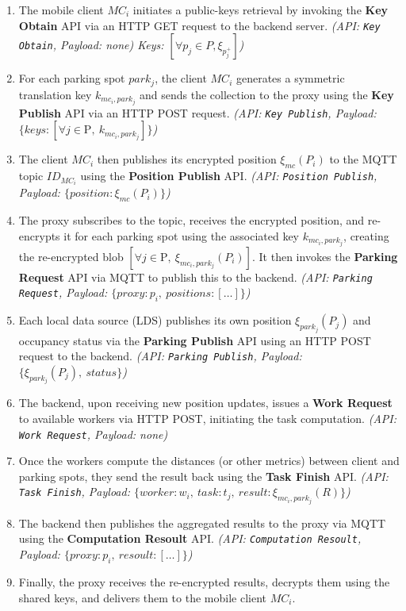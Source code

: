 \documentclass[12pt,a4paper,twoside]{book}
\begin{document}
\begin{enumerate}
    \item The mobile client $MC_i$ initiates a public-keys retrieval by invoking the \textbf{Key Obtain} API via an HTTP GET request to the backend server. \emph{(API: \texttt{Key Obtain}, Payload: none) \to Keys: $[\forall p_j \in P, \xi_{p_j^+}]$)}
    \item For each parking spot $park_j$, the client $MC_i$ generates a symmetric translation key $k_{mc_i, park_j}$ and sends the collection to the proxy using the \textbf{Key Publish} API via an HTTP POST request. \emph{(API: \texttt{Key Publish}, Payload: $\{keys: [\forall j \in \text{P},\ k_{mc_i, park_j}]\}$)}
    \item The client $MC_i$ then publishes its encrypted position $\xi_{mc}(P_i)$ to the MQTT topic $ID_{MC_i}$ using the \textbf{Position Publish} API. \emph{(API: \texttt{Position Publish}, Payload: $\{position: \xi_{mc}(P_i)\}$)}
    \item The proxy subscribes to the topic, receives the encrypted position, and re-encrypts it for each parking spot using the associated key $k_{mc_i, park_j}$, creating the re-encrypted blob $[\forall j \in \text{P},\ \xi_{mc_i, park_j}(P_i)]$. It then invokes the \textbf{Parking Request} API via MQTT to publish this to the backend. \emph{(API: \texttt{Parking Request}, Payload: $\{proxy: p_i,\ positions: [\ldots]\}$)}
    \item Each local data source (LDS) publishes its own position $\xi_{park_j}(P_j)$ and occupancy status via the \textbf{Parking Publish} API using an HTTP POST request to the backend. \emph{(API: \texttt{Parking Publish}, Payload: $\{\xi_{park_j}(P_j),\ status\}$)}
    \item The backend, upon receiving new position updates, issues a \textbf{Work Request} to available workers via HTTP POST, initiating the task computation. \emph{(API: \texttt{Work Request}, Payload: none)}
    \item Once the workers compute the distances (or other metrics) between client and parking spots, they send the result back using the \textbf{Task Finish} API. \emph{(API: \texttt{Task Finish}, Payload: $\{worker: w_i,\ task: t_j,\ result: \xi_{mc_i, park_j}(R)\}$)}
    \item The backend then publishes the aggregated results to the proxy via MQTT using the \textbf{Computation Resoult} API. \emph{(API: \texttt{Computation Resoult}, Payload: $\{proxy: p_i,\ resoult: [\ldots]\}$)}
    \item Finally, the proxy receives the re-encrypted results, decrypts them using the shared keys, and delivers them to the mobile client $MC_i$.
\end{enumerate}
\end{document}
